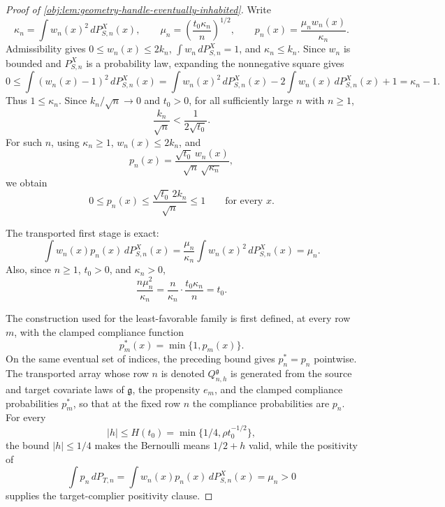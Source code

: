\documentclass[11pt]{article}
\begin{document}
\begin{proof}[Proof of \cref{obj:lem:geometry-handle-eventually-inhabited}]
Write
\[
\kappa_n=\int w_n(x)^2\,dP_{S,n}^X(x),
\qquad
\mu_n=\left(\frac{t_0\kappa_n}{n}\right)^{1/2},
\qquad
p_n(x)=\frac{\mu_n w_n(x)}{\kappa_n}.
\]
Admissibility gives \(0\le w_n(x)\le 2k_n\), \(\int w_n\,dP_{S,n}^X=1\), and \(\kappa_n\le k_n\). Since \(w_n\) is bounded and \(P_{S,n}^X\) is a probability law, expanding the nonnegative square gives
\[
0
\le
\int (w_n(x)-1)^2\,dP_{S,n}^X(x)
=
\int w_n(x)^2\,dP_{S,n}^X(x)
-2\int w_n(x)\,dP_{S,n}^X(x)+1
=
\kappa_n-1 .
\] %
Thus \(1\le \kappa_n\). Since \(k_n/\sqrt n\to0\) and \(t_0>0\), for all sufficiently large \(n\) with \(n\ge1\),
\[
\frac{k_n}{\sqrt n}<\frac1{2\sqrt{t_0}} .
\] %
For such \(n\), using \(\kappa_n\ge1\), \(w_n(x)\le2k_n\), and
\[
p_n(x)
=
\frac{\sqrt{t_0}\,w_n(x)}
{\sqrt n\,\sqrt{\kappa_n}},
\]
we obtain
\[
0\le p_n(x)
\le
\frac{\sqrt{t_0}\,2k_n}{\sqrt n}
\le 1
\qquad\text{for every }x .
\] %

The transported first stage is exact:
\[
\int w_n(x)p_n(x)\,dP_{S,n}^X(x)
=
\frac{\mu_n}{\kappa_n}
\int w_n(x)^2\,dP_{S,n}^X(x)
=
\mu_n .
\] %
Also, since \(n\ge1\), \(t_0>0\), and \(\kappa_n>0\),
\[
\frac{n\mu_n^2}{\kappa_n}
=
\frac{n}{\kappa_n}\cdot \frac{t_0\kappa_n}{n}
=
t_0 .
\] %

The construction used for the least-favorable family is first defined, at every row \(m\), with the clamped compliance function
\[
p_m^\ast(x)=\min\{1,p_m(x)\}.
\]
On the same eventual set of indices, the preceding bound gives \(p_n^\ast=p_n\) pointwise. The transported array whose row \(n\) is denoted \(Q_{n,h}^{\mathfrak g}\) is generated from the source and target covariate laws of \(\mathfrak g\), the propensity \(e_m\), and the clamped compliance probabilities \(p_m^\ast\), so that at the fixed row \(n\) the compliance probabilities are \(p_n\). For every
\[
|h|\le H(t_0)=\min\{1/4,\rho t_0^{-1/2}\},
\]
the bound \(|h|\le1/4\) makes the Bernoulli means \(1/2+h\) valid, while the positivity of
\[
\int p_n\,dP_{T,n}
=
\int w_n(x)p_n(x)\,dP_{S,n}^X(x)
=
\mu_n
>
0
\]
supplies the target-complier positivity clause.


\end{proof}
\end{document}
